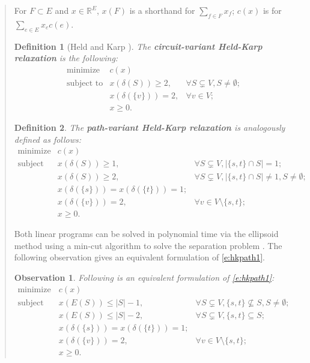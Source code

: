 \documentclass[11pt,letterpaper]{article}
\newtheorem{defn}{Definition}
\newtheorem{obs}{Observation}
\begin{document}
\begin{quote}
For $F\subset E$ and $x\in\mathbb{R}^E$, $x(F)$ is a shorthand for $\sum_{f\in F}x_f$; $c(x)$ is for $\sum_{e\in E}x_e c(e)$.

\begin{defn}[Held and Karp \cite{HK}]
\label{d:hkcircuit}
The \textbf{circuit-variant Held-Karp relaxation} is the following:\begin{equation}\label{e:hkcircuit}
\begin{array}{lll}
\textrm{minimize}&c(x)&\\
\textrm{subject to}&x(\delta(S))\geq 2,&\forall S\subsetneq V, S\neq\emptyset;\\
&x(\delta(\{v\})) = 2,&\forall v\in V;\\
&x\geq 0.&
\end{array}
\end{equation}
\end{defn}

\begin{defn}
\label{d:hkpath}
The \textbf{path-variant Held-Karp relaxation} is analogously defined as follows:\begin{equation}\label{e:hkpath1}
\begin{array}{lll}
\textrm{minimize}&c(x)&\\
\textrm{subject to}&x(\delta(S))\geq 1,&\forall S\subsetneq V, |\{s,t\}\cap S| = 1;\\
&x(\delta(S))\geq 2,&\forall S\subsetneq V, |\{s,t\}\cap S| \neq 1, S\neq\emptyset ;\\
&x(\delta(\{s\})) = x(\delta(\{t\})) = 1;&\\
&x(\delta(\{v\})) = 2,&\forall v\in V\setminus\{s,t\};\\
&x\geq 0.&
\end{array}
\end{equation}
\end{defn}

Both linear programs can be solved in polynomial time via the ellipsoid method using a min-cut algorithm to solve the separation problem \cite{GLS}. The following observation gives an equivalent formulation of \eqref{e:hkpath1}.

\begin{obs}
\label{o:hkequiv}
Following is an equivalent formulation of \eqref{e:hkpath1}:\begin{equation}\label{e:hkpath2}
\begin{array}{lll}
\textrm{minimize}&c(x)&\\
\textrm{subject to}&x(E(S))\leq |S|-1,&\forall S\subsetneq V, \{s,t\} \not\subseteq S, S\neq\emptyset;\\
&x(E(S))\leq |S|-2,&\forall S\subsetneq V, \{s,t\} \subseteq S;\\
&x(\delta(\{s\})) = x(\delta(\{t\})) = 1;&\\
&x(\delta(\{v\})) = 2,&\forall v\in V\setminus\{s,t\};\\
&x\geq 0.&
\end{array}
\end{equation}
\end{obs}


\end{quote}
\end{document}
